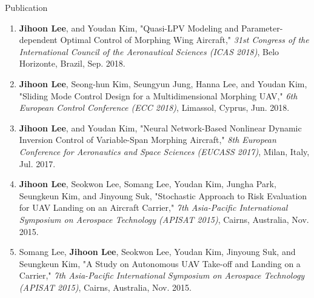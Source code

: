 \documentclass{resume}
\begin{document}
\begin{rSection}{Publication}
\begin{enumerate}
		\item \textbf{Jihoon Lee}, and Youdan Kim, "Quasi-LPV Modeling and Parameter-dependent Optimal Control of Morphing Wing Aircraft," \textit{31st Congress of the International Council of the Aeronautical Sciences (ICAS 2018)}, Belo Horizonte, Brazil, Sep. 2018. 
		
		\item \textbf{Jihoon Lee}, Seong-hun Kim, Seungyun Jung, Hanna Lee, and Youdan Kim, "Sliding Mode Control Design for a Multidimensional Morphing UAV," \textit{6th European Control Conference (ECC 2018)}, Limassol, Cyprus, Jun. 2018. 
		
		\item \textbf{Jihoon Lee}, and Youdan Kim, "Neural Network-Based Nonlinear Dynamic Inversion Control of Variable-Span Morphing Aircraft," \textit{8th European Conference for Aeronautics and Space Sciences (EUCASS 2017)}, Milan, Italy, Jul. 2017. 
		
		\item \textbf{Jihoon Lee}, Seokwon Lee, Somang Lee, Youdan Kim, Jungha Park, Seungkeun Kim, and Jinyoung Suk, "Stochastic Approach to Risk Evaluation for UAV Landing on an Aircraft Carrier," \textit{7th Asia-Pacific International Symposium on Aerospace Technology (APISAT 2015)}, Cairns, Australia, Nov. 2015. 
		
		\item Somang Lee, \textbf{Jihoon Lee}, Seokwon Lee, Youdan Kim, Jinyoung Suk, and Seungkeun Kim, "A Study on Autonomous UAV Take-off and Landing on a Carrier," \textit{7th Asia-Pacific International Symposium on Aerospace Technology (APISAT 2015)}, Cairns, Australia, Nov. 2015. 
	\end{enumerate}\renewcommand{\labelenumi}{\theenumi.}
		

\end{rSection}
\end{document}
